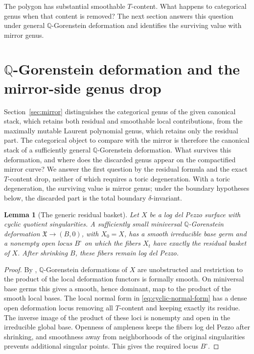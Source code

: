 \documentclass[11pt]{article}
\theoremstyle{plain}
\newtheorem{lemma}[theorem]{Lemma}
\theoremstyle{definition}
\theoremstyle{remark}
\newcommand{\Q}{\mathbb Q}
\newcommand{\1}{\mathbf 1}
\begin{document}
The polygon has substantial smoothable $T$-content.  What happens to categorical genus when that content is removed?  The next section answers this question under general $\Q$-Gorenstein deformation and identifies the surviving value with mirror genus.

\section{\texorpdfstring{$\Q$-Gorenstein}{Q-Gorenstein} deformation and the mirror-side genus drop}\label{sec:qg-generic}

Section~\ref{sec:mirror} distinguishes the categorical genus of the given canonical stack, which retains both residual and smoothable local contributions, from the maximally mutable Laurent polynomial genus, which retains only the residual part.  The categorical object to compare with the mirror is therefore the canonical stack of a sufficiently general $\Q$-Gorenstein deformation.  What survives this deformation, and where does the discarded genus appear on the compactified mirror curve?  We answer the first question by the residual formula and the exact $T$-content drop, neither of which requires a toric degeneration.  With a toric degeneration, the surviving value is mirror genus; under the boundary hypotheses below, the discarded part is the total boundary $\delta$-invariant.

\begin{lemma}[The generic residual basket]\label{lem:generic-residual-basket}
Let $X$ be a log del Pezzo surface with cyclic quotient singularities.  A sufficiently small miniversal $\Q$-Gorenstein deformation $\mathfrak X\to(B,0)$, with $X_0=X$, has a smooth irreducible base germ and a nonempty open locus $B^\circ$ on which the fibers $X_t$ have exactly the residual basket of $X$.  After shrinking $B$, these fibers remain log del Pezzo.
\end{lemma}

\begin{proof}
By \cite[Lemma 6]{ACC+}, $\Q$-Gorenstein deformations of $X$ are unobstructed and restriction to the product of the local deformation functors is formally smooth.  On miniversal base germs this gives a smooth, hence dominant, map to the product of the smooth local bases.  The local normal form in \eqref{eq:cyclic-normal-form} has a dense open deformation locus removing all $T$-content and keeping exactly its residue.  The inverse image of the product of these loci is nonempty and open in the irreducible global base.  Openness of ampleness keeps the fibers log del Pezzo after shrinking, and smoothness away from neighborhoods of the original singularities prevents additional singular points.  This gives the required locus $B^\circ$.
\end{proof}
\end{document}
